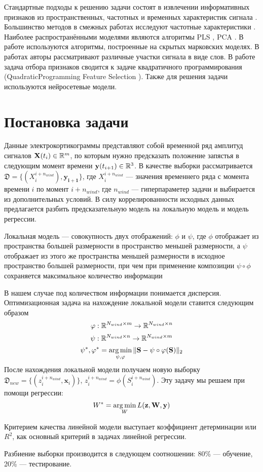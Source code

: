 \documentclass[12pt, twoside]{article}
\begin{document}
Стандартные подходы к решению задачи состоят в извлечении информативных признаков из пространственных, частотных и временных характеристик сигнала \cite{morishita2014brain, alexander2013traveling}. 
Большинство методов в смежных работах исследуют частотные характеристики \cite{chin2007identification, eliseyev2014stable, loza2017unsupervised}. Наиболее распространёнными моделями являются алгоритмы PLS \cite{eliseyev2014stable,eliseyev2016penalized, rosipal2005overview}, PCA \cite{rosipal2005overview, eliseyev2016penalized}. В работе \cite{zhao2014coupled} используются алгоритмы, построенные на скрытых марковских моделях. В работах \cite{loza2017unsupervised, zhao2010ecog} авторы рассматривают различные участки сигнала в виде слов. В работе \cite{motrenko2018multi} задача отбора признаков сводится к задаче квадратичного программирования (QuadraticProgramming Feature Selection \cite{rodriguez2010quadratic}). Также для решения задачи используются нейросетевые модели\cite{xie2018deep}. 
\newpage
\section{Постановка задачи}
Данные электрокортикограммы представляют собой временной ряд амплитуд сигналов $\mathbf{X}(t_i)  \in \mathbb{R}^{m}$, по которым нужно предсказать положение запястья в следующим момент времени $\mathbf{y}(t_{i+1}) \in \mathbb{R}^3$. В качестве выборки рассматривается $\mathfrak{D} = \{(X_i^{i+n_{wind}}), \mathbf{y_{i+1}}\}$, где $X_i^{i+n_{wind}}$ --- значения временнего ряда с момента времени $i$ по момент $i + n_{wind}$, где $n_{wind}$ --- гиперпараметер задачи и выбирается из дополнительных условий. В силу коррелированности исходных данных предлагается разбить предсказательную модель на локальную модель и модель регрессии.

\begin{Def}
	Локальная модель --- совокупность двух отображений: $\phi$ и $\psi$, где 
	$\phi$ отображает из пространства большей размерности в пространство меньшей размерности, а $\psi$ отображает из этого же пространства меньшей размерности в исходное пространство большей размерности, при чем при применение композиции $\psi \circ \phi$ сохраняется максимальное количество информации
\end{Def}

В нашем случае под количеством информации понимается дисперсия.
Оптимизационная задача на нахождение локальной модели ставится следующим образом
\[
	\phi: \RR^{N_{wind} \times m} \rightarrow \RR^{N_{wind} \times n}
\]
\[
	\psi: \RR^{N_{wind} \times n} \rightarrow \RR^{N_{wind} \times m}
\]
\[
	\psi^*, \phi^* = \argmin_{\psi, \phi} \|\mathbf{S} - \psi \circ \phi (\mathbf{S}) \|_2
\]
После нахождения локальной модели получаем новую выборку $\mathfrak{D}_{new} = \{(z_{i}^{i+n_{wind}}, \mathbf{x}_i)\}$, $z_{i}^{i+n_{wind}} = \phi(S_{i}^{i + n_{wind}})$. Эту задачу мы решаем при помощи регрессии:
\[
	W^* = \argmin_W L(\mathbf{z}, \mathbf{W}, \mathbf{y})
\]

Критерием качества линейной модели выступает коэффициент детерминации или $R^2$, как основный критерий в задачах линейной регрессии.

Разбиение выборки производится в следующем соотношении: 80\% --- обучение, 20\% --- тестирование.

\newpage


\end{document}
